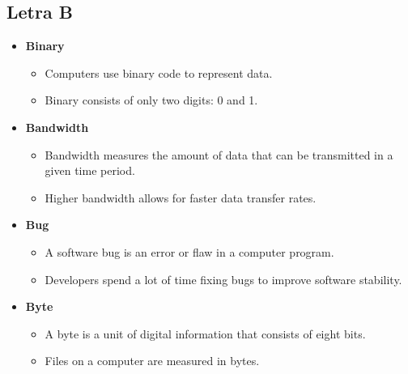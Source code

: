     \subsection{Letra B}
    \begin{itemize}
        \item \textbf{Binary}
        \begin{itemize}
            \item Computers use binary code to represent data.
            \item Binary consists of only two digits: 0 and 1.
        \end{itemize}
        \item \textbf{Bandwidth}
        \begin{itemize}
            \item Bandwidth measures the amount of data that can be transmitted in a given time period.
            \item Higher bandwidth allows for faster data transfer rates.
        \end{itemize}
        \item \textbf{Bug}
        \begin{itemize}
            \item A software bug is an error or flaw in a computer program.
            \item Developers spend a lot of time fixing bugs to improve software stability.
        \end{itemize}
        \item \textbf{Byte}
        \begin{itemize}
            \item A byte is a unit of digital information that consists of eight bits.
            \item Files on a computer are measured in bytes.
        \end{itemize}
    \end{itemize}

